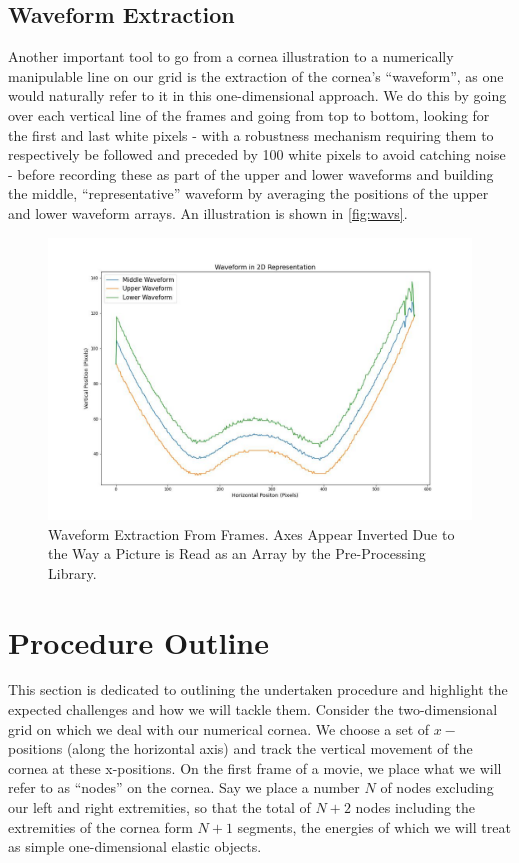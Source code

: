 \documentclass[epjST]{svjour}
\begin{document}
\subsection{Waveform Extraction}
Another important tool to go from a cornea illustration to a numerically manipulable line on our grid is the extraction of the cornea's ``waveform'', as one would naturally refer to it in this one-dimensional approach. We do this by going over each vertical line of the frames and going from top to bottom, looking for the first and last white pixels - with a robustness mechanism requiring them to respectively be followed and preceded by 100 white pixels to avoid catching noise - before recording these as part of the upper and lower waveforms and building the middle, ``representative'' waveform by averaging the positions of the upper and lower waveform arrays. An illustration is shown in \autoref{fig:wavs}.
\begin{figure}[h]
    \centering
    \includegraphics[width=1\linewidth]{figures/processing/IGNORE_1.jpg}
    \caption{Waveform Extraction From Frames. Axes Appear Inverted Due to the Way a Picture is Read as an Array by the Pre-Processing Library.}
    \label{fig:wavs}
\end{figure}
\section{Procedure Outline}
This section is dedicated to outlining the undertaken procedure and highlight the expected challenges and how we will tackle them. Consider the two-dimensional grid on which we deal with our numerical cornea. We choose a set of $x -$ positions (along the horizontal axis) and track the vertical movement of the cornea at these x-positions. On the first frame of a movie, we place what we will refer to as ``nodes'' on the cornea. Say we place a number $N$ of nodes excluding our left and right extremities, so that the total of $N+2$ nodes including the extremities of the cornea form $N+1$ segments, the energies of which we will treat as simple one-dimensional elastic objects.
\end{document}
